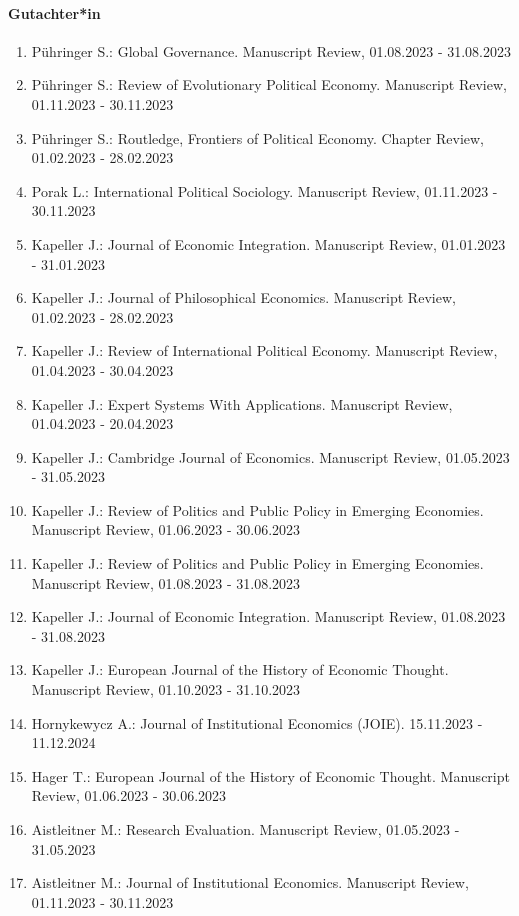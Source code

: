 \paragraph{Gutachter*in}
\begin{enumerate}[leftmargin=*, labelsep=0.5cm]
\item Pühringer S.: Global Governance. Manuscript Review, 01.08.2023 - 31.08.2023
\item Pühringer S.: Review of Evolutionary Political Economy. Manuscript Review, 01.11.2023 - 30.11.2023
\item Pühringer S.: Routledge, Frontiers of Political Economy. Chapter Review, 01.02.2023 - 28.02.2023
\item Porak L.: International Political Sociology. Manuscript Review, 01.11.2023 - 30.11.2023
\item Kapeller J.: Journal of Economic Integration. Manuscript Review, 01.01.2023 - 31.01.2023
\item Kapeller J.: Journal of Philosophical Economics. Manuscript Review, 01.02.2023 - 28.02.2023
\item Kapeller J.: Review of International Political Economy. Manuscript Review, 01.04.2023 - 30.04.2023
\item Kapeller J.: Expert Systems With Applications. Manuscript Review, 01.04.2023 - 20.04.2023
\item Kapeller J.: Cambridge Journal of Economics. Manuscript Review, 01.05.2023 - 31.05.2023
\item Kapeller J.: Review of Politics and Public Policy in Emerging Economies. Manuscript Review, 01.06.2023 - 30.06.2023
\item Kapeller J.: Review of Politics and Public Policy in Emerging Economies. Manuscript Review, 01.08.2023 - 31.08.2023
\item Kapeller J.: Journal of Economic Integration. Manuscript Review, 01.08.2023 - 31.08.2023
\item Kapeller J.: European Journal of the History of Economic Thought. Manuscript Review, 01.10.2023 - 31.10.2023
\item Hornykewycz A.: Journal of Institutional Economics (JOIE). 15.11.2023 - 11.12.2024
\item Hager T.: European Journal of the History of Economic Thought. Manuscript Review, 01.06.2023 - 30.06.2023
\item Aistleitner M.: Research Evaluation. Manuscript Review, 01.05.2023 - 31.05.2023
\item Aistleitner M.: Journal of Institutional Economics. Manuscript Review, 01.11.2023 - 30.11.2023
\end{enumerate}

